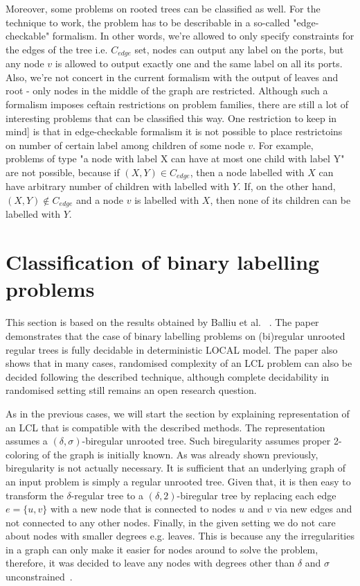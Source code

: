 Moreover, some problems on rooted trees can be classified as well. For the technique to work, the problem
has to be describable in a so-called "edge-checkable" formalism. In other words, we're allowed to
only specify constraints for the edges of the tree i.e. $C_{edge}$ set, nodes can output any label
on the ports, but any node $v$ is allowed to output exactly one and the same label on all its ports.
Also, we're not concert in the current formalism with the output of leaves and root - only nodes in the
middle of the graph are restricted. Although such a formalism imposes ceftain restrictions on problem families,
there are still a lot of interesting problems that can be classified this way. One restriction to keep in mind]
is that in edge-checkable formalism it is not possible to place restrictoins on number of certain label
among children of some node $v$. For example, problems of type "a node with label X can have at most one child with label Y"
are not possible, because if $(X, Y) \in C_{edge}$, then a node labelled with $X$ can have arbitrary number of children
with labelled with $Y$. If, on the other hand, $(X, Y) \notin C_{edge}$ and a node $v$ is labelled with $X$, then
none of its children can be labelled with $Y$.

\section{Classification of binary labelling problems}

This section is based on the results obtained by Balliu et al. ~\cite{Balliu2019c}. The paper demonstrates
that the case of binary labelling problems on (bi)regular unrooted regular trees is fully decidable in
deterministic LOCAL model. The paper also shows that in many cases, randomised complexity of an LCL problem
can also be decided following the described technique, although complete decidability in randomised setting
still remains an open research question.

As in the previous cases, we will start the section by explaining representation of an LCL that is compatible
with the described methods. The representation assumes a $(\delta, \sigma)$-biregular unrooted tree.
Such biregularity assumes proper 2-coloring of the graph is initially known.
As was already shown previously, biregularity is not actually necessary. It is
sufficient that an underlying graph of an input problem is simply a regular
unrooted tree. Given that, it is then easy to transform the $\delta$-regular tree
to a $(\delta, 2)$-biregular tree by replacing each edge $e = \{u, v\}$ with a new node that is
connected to nodes $u$ and $v$ via new edges and not connected to any other nodes. Finally,
in the given setting we do not care about nodes with smaller degrees e.g. leaves. This is
because any the irregularities in a graph can only make it easier for nodes around to solve
the problem, therefore, it was decided to leave any nodes with degrees other than $\delta$
and $\sigma$ unconstrained~\cite{Balliu2019c}.

